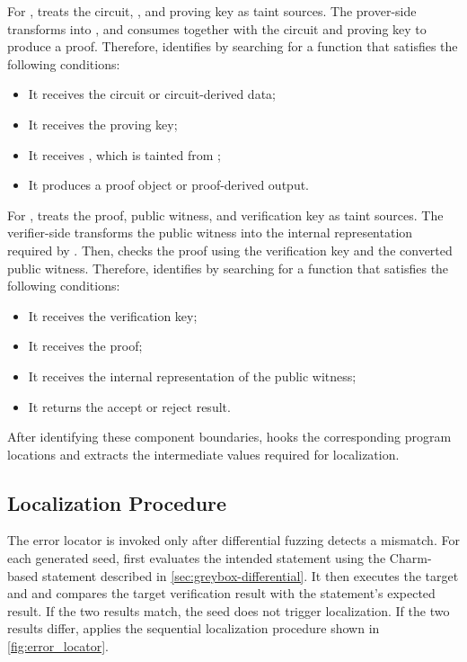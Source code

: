 For \pprog, \greyboxfuzz treats the circuit, \witnessorg, and proving key as taint sources. The prover-side  transforms \witnessorg into \witnessint, and \pfunc consumes \witnessint together with the circuit and proving key to produce a proof. Therefore, \greyboxfuzz identifies \pfunc by searching for a function that satisfies the following conditions:


\begin{itemize}[leftmargin=*]
    \setlength{\itemsep}{0pt}
    \setlength{\parskip}{0pt}
    \item It receives the circuit or circuit-derived data;
    \item It receives the proving key;
    \item It receives \witnessint, which is tainted from \witnessorg;
    \item It produces a proof object or proof-derived output.
\end{itemize}

For \vprog, \greyboxfuzz treats the proof, public witness, and verification key as taint sources. The verifier-side  transforms the public witness into the internal representation required by \vfunc. Then, \vfunc checks the proof using the verification key and the converted public witness. Therefore, \greyboxfuzz identifies \vfunc by searching for a function that satisfies the following conditions:

\begin{itemize}[leftmargin=*]
    \setlength{\itemsep}{0pt}
    \setlength{\parskip}{0pt}
    \item It receives the verification key;
    \item It receives the proof;
    \item It receives the internal representation of the public witness;
    \item It returns the accept or reject result.
\end{itemize}

After identifying these component boundaries, \greyboxfuzz hooks the corresponding program locations and extracts the intermediate values required for localization.

\subsection{Localization Procedure}


The error locator is invoked only after differential fuzzing detects a mismatch. For each generated seed, \greyboxfuzz first evaluates the intended statement using the Charm-based statement described in \autoref{sec:greybox-differential}. It then executes the target \pprog and \vprog and compares the target verification result with the statement's expected result. If the two results match, the seed does not trigger localization. If the two results differ, \greyboxfuzz applies the sequential localization procedure shown in \autoref{fig:error_locator}.


